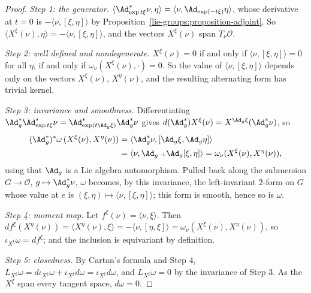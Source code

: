 \begin{proof}
\emph{Step 1: the generator.} $\langle\Ad^*_{\exp t\xi}\nu, \eta\rangle = \langle\nu, \Ad_{\exp(-t\xi)}\eta\rangle$, whose derivative at $t = 0$ is $-\langle\nu, [\xi, \eta]\rangle$ by Proposition~\ref{lie-groups:proposition-adjoint}.
So $\langle X^\xi(\nu), \eta\rangle = -\langle\nu, [\xi, \eta]\rangle$, and the vectors $X^\xi(\nu)$ span $T_\nu\mathcal{O}$.

\emph{Step 2: well defined and nondegenerate.} $X^\xi(\nu) = 0$ if and only if $\langle\nu, [\xi, \eta]\rangle = 0$ for all $\eta$, if and only if $\omega_\nu(X^\xi(\nu), \cdot) = 0$. So the value of
$\langle\nu, [\xi, \eta]\rangle$ depends only on the vectors $X^\xi(\nu)$, $X^\eta(\nu)$, and the resulting alternating form has trivial kernel.

\emph{Step 3: invariance and smoothness.} Differentiating $\Ad^*_g\Ad^*_{\exp t\xi}\nu = \Ad^*_{\exp(t\Ad_g\xi)}\Ad^*_g\nu$ gives $d(\Ad^*_g)X^\xi(\nu) = X^{\Ad_g\xi}(\Ad^*_g\nu)$, so
\[\begin{aligned}
(\Ad^{*}_g)^*\omega\,(X^\xi(\nu), X^\eta(\nu)) &= \langle\Ad^*_g\nu, [\Ad_g\xi, \Ad_g\eta]\rangle\\
&= \langle\nu, \Ad_{g^{-1}}\Ad_g[\xi, \eta]\rangle = \omega_\nu(X^\xi(\nu), X^\eta(\nu)),
\end{aligned}\]
using that $\Ad_g$ is a Lie algebra automorphism. Pulled back along the submersion $G \to \mathcal{O}$, $g \mapsto \Ad^*_g\nu$, $\omega$ becomes, by this invariance, the left-invariant $2$-form on $G$ whose value at $e$ is
$(\xi, \eta) \mapsto \langle\nu, [\xi, \eta]\rangle$; this form is smooth, hence so is $\omega$.

\emph{Step 4: moment map.} Let $f^\xi(\nu) = \langle\nu, \xi\rangle$. Then $df^\xi(X^\eta(\nu)) = \langle X^\eta(\nu), \xi\rangle = -\langle\nu, [\eta, \xi]\rangle = \omega_\nu(X^\xi(\nu), X^\eta(\nu))$, so $\iota_{X^\xi}\omega = df^\xi$; and
the inclusion is equivariant by definition.

\emph{Step 5: closedness.} By Cartan's formula and Step 4, $L_{X^\xi}\omega = d\iota_{X^\xi}\omega + \iota_{X^\xi}d\omega = \iota_{X^\xi}d\omega$, and $L_{X^\xi}\omega = 0$ by the invariance of Step 3. As the $X^\xi$ span every
tangent space, $d\omega = 0$.
\end{proof}

